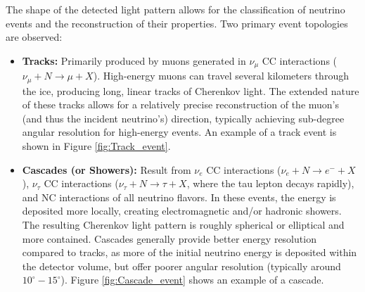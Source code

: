 The shape of the detected light pattern allows for the classification of neutrino events and the reconstruction of their properties. Two primary event topologies are observed:
\begin{itemize}
    \item \textbf{Tracks:} Primarily produced by muons generated in $ \nu_{\mu} $ CC interactions ($ \nu_{\mu} + N \rightarrow \mu + X $). High-energy muons can travel several kilometers through the ice, producing long, linear tracks of Cherenkov light. The extended nature of these tracks allows for a relatively precise reconstruction of the muon's (and thus the incident neutrino's) direction, typically achieving sub-degree angular resolution for high-energy events. An example of a track event is shown in Figure \ref{fig:Track_event}.
    \item \textbf{Cascades (or Showers):} Result from $ \nu_e $ CC interactions ($ \nu_e + N \rightarrow e^- + X $), $ \nu_{\tau} $ CC interactions ($ \nu_{\tau} + N \rightarrow \tau + X $, where the tau lepton decays rapidly), and NC interactions of all neutrino flavors. In these events, the energy is deposited more locally, creating electromagnetic and/or hadronic showers. The resulting Cherenkov light pattern is roughly spherical or elliptical and more contained. Cascades generally provide better energy resolution compared to tracks, as more of the initial neutrino energy is deposited within the detector volume, but offer poorer angular resolution (typically around $10^\circ - 15^\circ$). Figure \ref{fig:Cascade_event} shows an example of a cascade.
\end{itemize}


